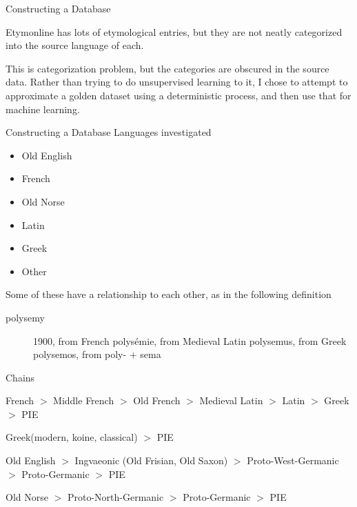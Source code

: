 \documentclass[10pt]{beamer}
\begin{document}
\begin{frame}[fragile]{Constructing a Database}

  Etymonline has lots of etymological entries, but they are not neatly categorized into the source language of each.
  
  This is categorization problem, but the categories are obscured in the source data. Rather than trying to do unsupervised learning to it, I chose to attempt to approximate a golden dataset using a deterministic process, and then use that for machine learning. 
  
\end{frame}

\begin{frame}[fragile]{Constructing a Database}
  Languages investigated 

  \begin{itemize}[<+->]
  \item Old English
  \item French 
  \item Old Norse
  \item Latin
  \item Greek
  \item Other
  \end{itemize}

\pause
  Some of these have a relationship to each other, as in the following definition


  \begin{description}
  \item[polysemy] 1900, from French polysémie, from Medieval Latin polysemus, from Greek polysemos, from poly- + sema
  \end{description}

\end{frame}



\begin{frame}[fragile]{Chains}
  
  French $>$ Middle French $>$ Old French $>$ Medieval Latin $>$ Latin $>$ Greek $>$ PIE

  Greek(modern, koine, classical) $>$ PIE

  Old English $>$ Ingvaeonic (Old Frisian, Old Saxon) $>$ Proto-West-Germanic $>$ Proto-Germanic $>$ PIE
  

  Old Norse $>$ Proto-North-Germanic $>$ Proto-Germanic $>$ PIE

\end{frame}
\end{document}
